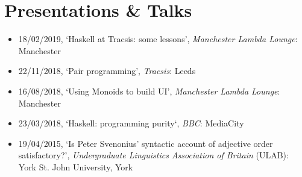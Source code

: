 \section{Presentations \& Talks}

\begin{itemize}
	\item 18/02/2019, `Haskell at Tracsis: some lessons', \emph{Manchester Lambda Lounge}: Manchester
	\item 22/11/2018, `Pair programming', \emph{Tracsis}: Leeds
	\item 16/08/2018, `Using Monoids to build UI', \emph{Manchester Lambda Lounge}: Manchester
	\item 23/03/2018, `Haskell: programming purity`, \emph{BBC}: MediaCity
	\item 19/04/2015, `Is Peter Svenonius' syntactic account of adjective order satisfactory?', \emph{Undergraduate Linguistics Association of Britain} (ULAB): York St. John University, York
\end{itemize}